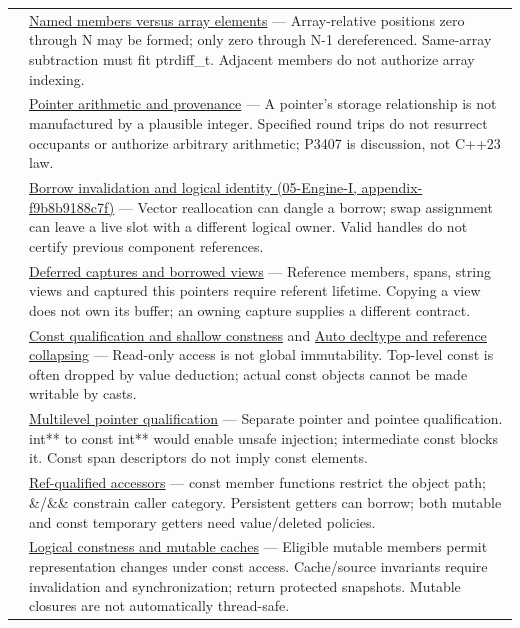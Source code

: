 {\begin{longtable}[]{@{}
  >{\raggedright\arraybackslash}p{}
  >{\raggedright\arraybackslash}p{}@{}}
119 & \hyperref[appendix-3f7e15effba6]{Named members versus array elements} --- Array-relative positions zero through N may be formed; only zero through N-1 dereferenced. Same-array subtraction must fit ptrdiff\_t. Adjacent members do not authorize array indexing. \\
120 & \hyperref[appendix-6af5921bc853]{Pointer arithmetic and provenance} --- A pointer's storage relationship is not manufactured by a plausible integer. Specified round trips do not resurrect occupants or authorize arbitrary arithmetic; P3407 is discussion, not C++23 law. \\
121 & \href{}{Borrow invalidation and logical identity (05-Engine-I, appendix-f9b8b9188c7f)} --- Vector reallocation can dangle a borrow; swap assignment can leave a live slot with a different logical owner. Valid handles do not certify previous component references. \\
122 & \hyperref[appendix-aea529eb5175]{Deferred captures and borrowed views} --- Reference members, spans, string views and captured this pointers require referent lifetime. Copying a view does not own its buffer; an owning capture supplies a different contract. \\
123 & \hyperref[appendix-c25d60fed375]{Const qualification and shallow constness} and \hyperref[appendix-5d4252a42886]{Auto decltype and reference collapsing} --- Read-only access is not global immutability. Top-level const is often dropped by value deduction; actual const objects cannot be made writable by casts. \\
124 & \hyperref[appendix-5e1a7561cd98]{Multilevel pointer qualification} --- Separate pointer and pointee qualification. int** to const int** would enable unsafe injection; intermediate const blocks it. Const span descriptors do not imply const elements. \\
125 & \hyperref[appendix-d42039b1d6f7]{Ref-qualified accessors} --- const member functions restrict the object path; \&/\&\& constrain caller category. Persistent getters can borrow; both mutable and const temporary getters need value/deleted policies. \\
126 & \hyperref[appendix-f5593256bcaf]{Logical constness and mutable caches} --- Eligible mutable members permit representation changes under const access. Cache/source invariants require invalidation and synchronization; return protected snapshots. Mutable closures are not automatically thread-safe. \\
\end{longtable}
}

